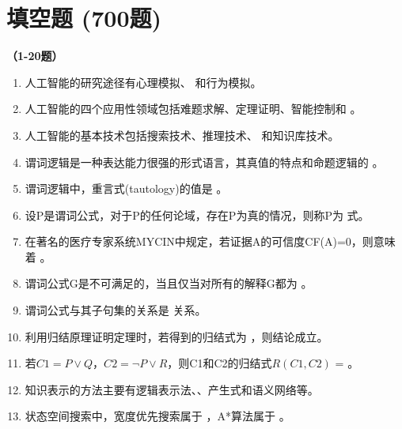\section{填空题 (700题)}

\textbf{（1-20题）}
\begin{enumerate}[leftmargin=2em,itemsep=1pt]
\item 人工智能的研究途径有心理模拟、\underline{\hspace{3em}} 和行为模拟。
\item 人工智能的四个应用性领域包括难题求解、定理证明、智能控制和 \underline{\hspace{3em}}。
\item 人工智能的基本技术包括搜索技术、推理技术、\underline{\hspace{3em}} 和知识库技术。
\item 谓词逻辑是一种表达能力很强的形式语言，其真值的特点和命题逻辑的 \underline{\hspace{3em}}。
\item 谓词逻辑中，重言式(tautology)的值是 \underline{\hspace{3em}}。
\item 设P是谓词公式，对于P的任何论域，存在P为真的情况，则称P为 \underline{\hspace{3em}} 式。
\item 在著名的医疗专家系统MYCIN中规定，若证据A的可信度CF(A)=0，则意味着 \underline{\hspace{3em}}。
\item 谓词公式G是不可满足的，当且仅当对所有的解释G都为 \underline{\hspace{3em}}。
\item 谓词公式与其子句集的关系是 \underline{\hspace{3em}} 关系。
\item 利用归结原理证明定理时，若得到的归结式为 \underline{\hspace{3em}}，则结论成立。
\item 若$C1=P \lor Q$，$C2=\neg P \lor R$，则C1和C2的归结式$R(C1,C2)$ = \underline{\hspace{3em}}。
\item 知识表示的方法主要有逻辑表示法、\underline{\hspace{3em}}、产生式和语义网络等。
\item 状态空间搜索中，宽度优先搜索属于 \underline{\hspace{3em}}，A*算法属于 \underline{\hspace{3em}}。

\end{enumerate}
